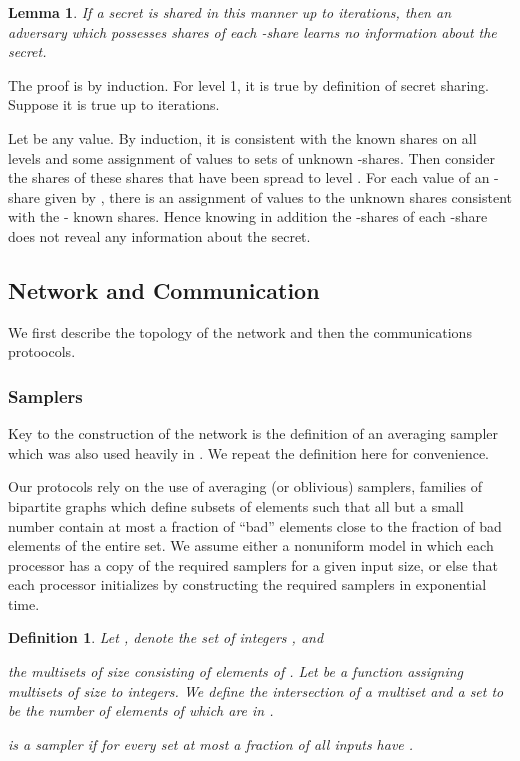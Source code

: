 \documentclass[letterpaper,11pt]{article}
\newtheorem{lemma}{Lemma}
\newtheorem{definition}{Definition}
\newcommand{\sq}{\hbox{\rlap{}}}
\newcommand{\qed}{\hspace*{\fill}\sq}
\newenvironment{proof}{\noindent {\bf Proof:}}{\qed\par\vskip 4mm\par}
\begin{document}
\begin{lemma} \label{secret}  If a secret  is shared in this manner  up to  iterations, then an adversary which possesses   shares of each -share learns no information about the secret.  \end{lemma}
\begin{proof}
The proof is by induction. For level 1, it is true by definition of secret sharing.
Suppose it is true up to  iterations. 

 Let  be any value. By induction, it is consistent
with the  known  shares  on all levels  and some assignment  of values to sets of unknown  -shares. Then
consider the shares of these shares that have been spread to level .  For each  value of an -share given by ,  there is an assignment  of values to the unknown   shares  consistent with the  - known shares.  Hence knowing in addition the
 -shares of each
-share does not reveal any information about  the secret. 
\end{proof}





\subsection{Network and Communication}\label{network}
We first describe the topology of the network and then the communications protoocols. 

\subsubsection{Samplers}
Key to the construction of the network is the definition of an averaging sampler which was also used heavily in \cite{KKKSS-TALG,KSSV2}.
We repeat the definition here for convenience. 

Our protocols rely on the use of averaging (or
oblivious) samplers, families of bipartite graphs which define
subsets of elements such that all but a small number contain at
most a fraction of ``bad'' elements close to the fraction of bad
elements of the entire set.  We assume either a nonuniform model in
which each processor has a copy of the required samplers for a
given input size, or else that each processor initializes by
constructing the required samplers in exponential time.

\begin{definition}
Let , denote the set of integers , and

the multisets of size  consisting of elements of .
Let  be a function assigning
multisets 
of size  to integers. We define the intersection of a multiset  and a set  to be the number of 
elements of  which are in .


 is a  sampler if
for every set 
at most a  fraction of all inputs  have
.
\end{definition}
\end{document}
